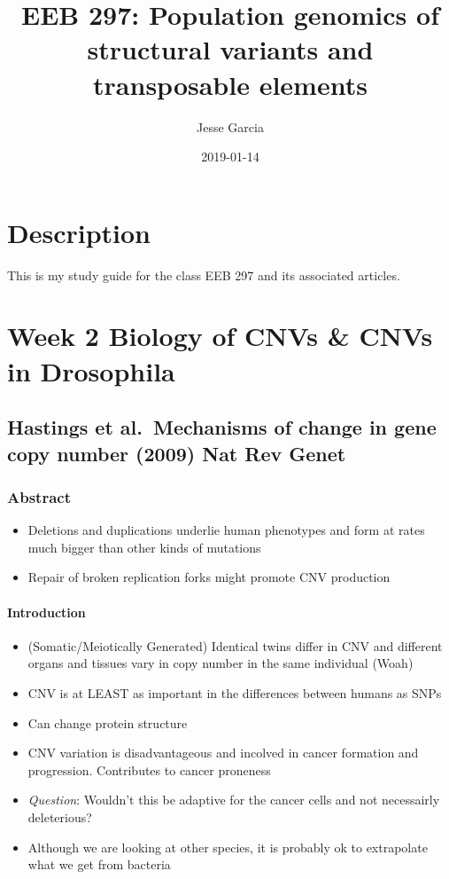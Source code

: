 \documentclass[]{book}
\title{EEB 297: Population genomics of structural variants and transposable elements}
\author{Jesse Garcia}
\date{2019-01-14}
\providecommand{\tightlist}{%
  \setlength{\itemsep}{0pt}\setlength{\parskip}{0pt}}
\begin{document}
\maketitle

{
\setcounter{tocdepth}{1}
\tableofcontents
}
\hypertarget{description}{%
\chapter{Description}\label{description}}

This is my study guide for the class EEB 297 and its associated articles.

\hypertarget{week2}{%
\chapter{Week 2 Biology of CNVs \& CNVs in Drosophila}\label{week2}}

\hypertarget{hastings-et-al.mechanisms-of-change-in-gene-copy-number-2009-nat-rev-genet}{%
\section{Hastings et al.~Mechanisms of change in gene copy number (2009) Nat Rev Genet}\label{hastings-et-al.mechanisms-of-change-in-gene-copy-number-2009-nat-rev-genet}}

\hypertarget{abstract}{%
\subsection{Abstract}\label{abstract}}

\begin{itemize}
\tightlist
\item
  Deletions and duplications underlie human phenotypes and form at rates much bigger than other kinds of mutations
\item
  Repair of broken replication forks might promote CNV production
\end{itemize}

\hypertarget{introduction}{%
\subsubsection{Introduction}\label{introduction}}

\begin{itemize}
\tightlist
\item
  (Somatic/Meiotically Generated) Identical twins differ in CNV and different organs and tissues vary in copy number in the same individual (Woah)
\item
  CNV is at LEAST as important in the differences between humans as SNPs
\item
  Can change protein structure
\item
  CNV variation is disadvantageous and incolved in cancer formation and progression. Contributes to cancer proneness
\item
  \emph{Question}: Wouldn't this be adaptive for the cancer cells and not necessairly deleterious?
\item
  Although we are looking at other species, it is probably ok to extrapolate what we get from bacteria
\end{itemize}
\end{document}
